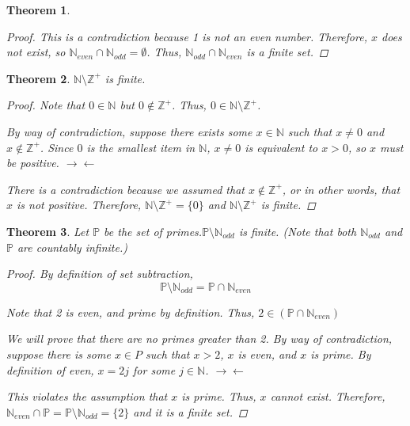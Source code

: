 \documentclass{article}
\newcommand{\contradiction}{$\rightarrow\leftarrow$}
\newtheorem{theorem}{Theorem}
\begin{document}
\begin{outline}[enumerate]
\begin{theorem}
\begin{proof}
            This is a contradiction because 1 is not an even number. Therefore, $x$ does not exist, so $\mathbb{N}_{even} \cap \mathbb{N}_{odd} = \emptyset$. Thus, $\mathbb{N}_{odd} \cap \mathbb{N}_{even}$ is a finite set.
        \end{proof}
        \end{theorem}
    \1
        \2 \begin{theorem}
            $\mathbb{N} \setminus \mathbb{Z}^+$ is finite.
            \begin{proof}
                Note that $0 \in \mathbb{N}$ but $0 \notin \mathbb{Z}^+$. Thus, $0 \in \mathbb{N} \setminus \mathbb{Z}^+$.

                By way of contradiction, suppose there exists some $x \in \mathbb{N}$ such that $x \neq 0$ and $x \notin \mathbb{Z}^+$. Since $0$ is the smallest item in $\mathbb{N}$, $x \neq 0$ is equivalent to $x > 0$, so $x$ must be positive. \contradiction

                There is a contradiction because we assumed that $x \notin \mathbb{Z}^+$, or in other words, that $x$ is not positive. Therefore, $\mathbb{N} \setminus \mathbb{Z}^+ = \{0\}$ and $\mathbb{N} \setminus \mathbb{Z}^+$ is finite.
            \end{proof}
        \end{theorem}
        \2 \begin{theorem}
            Let $\mathbb{P}$ be the set of primes.$\mathbb{P} \setminus \mathbb{N}_{odd}$ is finite. (Note that both $\mathbb{N}_{odd}$ and $\mathbb{P}$ are countably infinite.) 
            \begin{proof}
                By definition of set subtraction, 
                $$\mathbb{P} \setminus \mathbb{N}_{odd} = \mathbb{P} \cap \mathbb{N}_{even}$$

                Note that 2 is even, and prime by definition. Thus, $2 \in (\mathbb{P} \cap \mathbb{N}_{even})$
                
                We will prove that there are no primes greater than 2. By way of contradiction, suppose there is some $x \in P$ such that $x > 2$, $x$ is even, and $x$ is prime. By definition of even, $x = 2j$ for some $j \in \mathbb{N}$. \contradiction

                This violates the assumption that $x$ is prime. Thus, $x$ cannot exist. Therefore, $\mathbb{N}_{even} \cap \mathbb{P} = \mathbb{P} \setminus \mathbb{N}_{odd} = \{2\}$ and it is a finite set.
            \end{proof}
        \end{theorem}


\end{outline}
\end{document}
